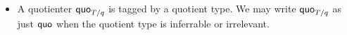 \begin{itemize}
\item
A quotienter $\mathsf{quo}_{T/q}$ is tagged by a quotient type. We may write $\mathsf{quo}_{T/q}$ as
just $\mathsf{quo}$ when the quotient type is inferrable or irrelevant.
\end{itemize}

